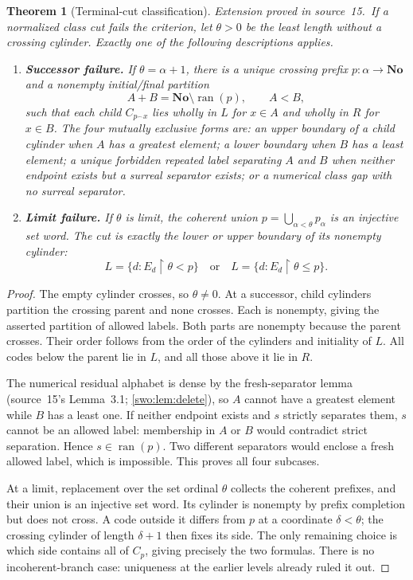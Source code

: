 \documentclass[11pt]{article}
\newtheorem{theorem}{Theorem}[section]
\theoremstyle{definition}
\theoremstyle{remark}
\newcommand{\No}{\mathbf{No}}
\newcommand{\ran}{\operatorname{ran}}
\newcommand{\concat}{\mathbin{{}^\frown}}
\newcommand{\res}{\mathbin{\upharpoonright}}
\begin{document}
\begin{theorem}[Terminal-cut classification]\label{swo:cb:thm:terminal}
\textit{Extension proved in source~15.}\ If a normalized class cut fails the criterion, let
$\theta>0$ be the least length without a crossing cylinder.
Exactly one of the following descriptions applies.
\begin{enumerate}
\item \textbf{Successor failure.} If $\theta=\alpha+1$, there is a unique
crossing prefix $p:\alpha\to\No$ and a nonempty initial/final partition
\[
 A+B=\No\setminus\ran(p),\qquad A<B,
\]
such that each child $C_{p\concat x}$ lies wholly in $L$ for $x\in A$
and wholly in $R$ for $x\in B$. The four mutually exclusive forms are:
an upper boundary of a child cylinder when $A$ has a greatest element;
a lower boundary when $B$ has a least element;
a unique forbidden repeated label separating $A$ and $B$ when neither
endpoint exists but a surreal separator exists;
or a numerical class gap with no surreal separator.
\item \textbf{Limit failure.} If $\theta$ is limit, the coherent union
$p=\bigcup_{\alpha<\theta}p_\alpha$ is an injective set word. The cut
is exactly the lower or upper boundary of its nonempty cylinder:
\[
 L=\{d:E_d\res\theta<p\}
 \quad\text{or}\quad
 L=\{d:E_d\res\theta\leq p\}.
\]
\end{enumerate}
\end{theorem}
\begin{proof}
The empty cylinder crosses, so $\theta\ne0$. At a successor, child
cylinders partition the crossing parent and none crosses. Each is
nonempty, giving the asserted partition of allowed labels. Both parts
are nonempty because the parent crosses. Their order follows from the
order of the cylinders and initiality of $L$. All codes below the
parent lie in $L$, and all those above it lie in $R$.

The numerical residual alphabet is dense by the fresh-separator lemma
(source~15's Lemma~3.1; \cref{swo:lem:delete}),
so $A$ cannot have a greatest element while $B$ has a least one.
If neither endpoint exists and $s$ strictly separates them, $s$ cannot
be an allowed label: membership in $A$ or $B$ would contradict strict
separation. Hence $s\in\ran(p)$. Two different separators would enclose
a fresh allowed label, which is impossible. This proves all four subcases.

At a limit, replacement over the set ordinal $\theta$ collects the
coherent prefixes, and their union is an injective set word. Its
cylinder is nonempty by prefix completion but does not cross. A code
outside it differs from $p$ at a coordinate $\delta<\theta$; the
crossing cylinder of length $\delta+1$ then fixes its side. The only
remaining choice is which side contains all of $C_p$, giving precisely
the two formulas. There is no incoherent-branch case: uniqueness at the
earlier levels already ruled it out.
\end{proof}
\end{document}
